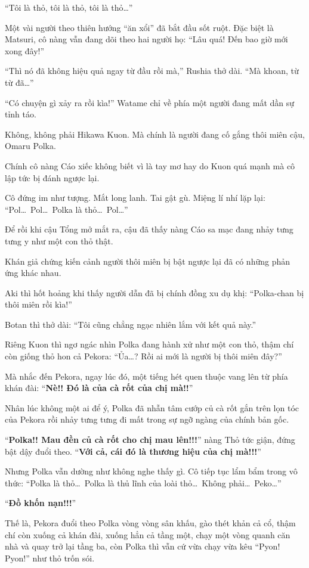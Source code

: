 \documentclass[../main.tex]{subfiles}
\begin{document}
``Tôi là thỏ, tôi là thỏ, tôi là thỏ\dots''

Một vài người theo thiên hướng ``ăn xổi'' đã bắt đầu sốt ruột. Đặc biệt là Matsuri, cô nàng vẫn đang dõi theo hai người họ: ``Lâu quá! Đến bao giờ mới xong đây!''

``Thì nó đã không hiệu quả ngay từ đầu rồi mà,'' Rushia thở dài. ``Mà khoan, từ từ đã\dots''

``Có chuyện gì xảy ra rồi kìa!'' Watame chỉ về phía một người đang mất dần sự tỉnh táo.

Không, không phải Hikawa Kuon. Mà chính là người đang cố gắng thôi miên cậu, Omaru Polka.

Chính cô nàng Cáo xiếc không biết vì là tay mơ hay do Kuon quá mạnh mà cô lập tức bị đánh ngược lại.

Cô đứng im như tượng. Mắt long lanh. Tai gật gù. Miệng lí nhí lặp lại: ``Pol\dots\ Pol\dots\ Polka là thỏ\dots\ Pol\dots''

Để rồi khi cậu Tổng mở mắt ra, cậu đã thấy nàng Cáo sa mạc đang nhảy tưng tưng y như một con thỏ thật.

Khán giả chứng kiến cảnh người thôi miên bị bật ngược lại đã có những phản ứng khác nhau.

Aki thì hốt hoảng khi thấy người dẫn đã bị chính đồng xu dụ khị: ``Polka-chan bị thôi miên rồi kìa!''

Botan thì thở dài: ``Tôi cũng chẳng ngạc nhiên lắm với kết quả này.''

Riêng Kuon thì ngơ ngác nhìn Polka đang hành xử như một con thỏ, thậm chí còn giống thỏ hon cả Pekora: ``Ủa\dots? Rồi ai mới là người bị thôi miên đây?''

Mà nhắc đến Pekora, ngay lúc đó, một tiếng hét quen thuộc vang lên từ phía khán đài: ``\textbf{Nè!! Đó là của cà rốt của chị mà!!}''

Nhân lúc không một ai để ý, Polka đã nhẫn tâm cướp củ cà rốt gắn trên lọn tóc của Pekora rồi nhảy tưng tưng đi mất trong sự ngỡ ngàng của chính bản gốc.

``\textbf{Polka!! Mau đền củ cà rốt cho chị mau lên!!!}'' nàng Thỏ tức giận, đứng bật dậy đuổi theo. ``\textbf{Với cả, cái đó là thương hiệu của chị mà!!!}''

Nhưng Polka vẫn dường như không nghe thấy gì. Cô tiếp tục lẩm bẩm trong vô thức: ``Polka là thỏ\dots\ Polka là thủ lĩnh của loài thỏ\dots\ Không phải\dots\ Peko\dots''

``\textbf{Đồ khốn nạn!!!}''

Thế là, Pekora đuổi theo Polka vòng vòng sân khấu, gào thét khản cả cổ, thậm chí còn xuống cả khán đài, xuống hẳn cả tầng một, chạy một vòng quanh căn nhà và quay trở lại tầng ba, còn Polka thì vẫn cứ vừa chạy vừa kêu ``Pyon! Pyon!'' như thỏ trốn sói.
\end{document}
